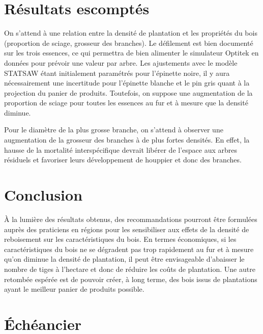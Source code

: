 \documentclass[letterpaper, 12pt]{article}
\begin{document}
\begin{onehalfspace}
\section{Résultats escomptés}

On s’attend à une relation entre la densité de plantation et les propriétés du bois (proportion de sciage, grosseur des branches). Le défilement est bien documenté sur les trois essences, ce qui permettra de bien alimenter le simulateur Optitek en données pour prévoir une valeur par arbre. Les ajustements avec le modèle STATSAW étant initialement paramétrés pour l'épinette noire, il y aura nécessairement une incertitude pour l'épinette blanche et le pin gris quant à la projection du panier de produits. Toutefois, on suppose une augmentation de la proportion de sciage pour toutes les essences au fur et à mesure que la densité diminue. 

\vspace{12pt}
Pour le diamètre de la plus grosse branche, on s'attend à observer une augmentation de la grosseur des branches à de plus fortes densités. En effet, la hausse de la mortalité interspécifique devrait libérer de l'espace aux arbres résiduels et favoriser leurs développement de houppier et donc des branches. 





\section{Conclusion}

À la lumière des résultats obtenus, des recommandations pourront être formulées auprès des praticiens en régions pour les sensibiliser aux effets de la densité de reboisement sur les caractéristiques du bois. En  termes  économiques,  si  les caractéristiques du bois ne se dégradent pas trop rapidement au fur et à mesure qu'on diminue la densité de plantation,  il peut être envisageable d'abaisser le nombre de tiges à l'hectare et donc de réduire les  coûts  de  plantation. Une autre retombée espérée est de pouvoir créer, à long terme, des bois issus de plantations ayant le meilleur panier de produits possible. 

\end{onehalfspace}

\section{Échéancier}
\end{document}
